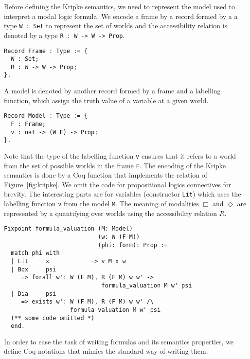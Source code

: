 \documentclass[sigconf,anonymous]{acmart}
\begin{document}
Before defining the Kripke semantics, we need to represent the model used to
interpret a modal logic formula. We encode a frame by a record formed by a
a type \texttt{W : Set} to represent the set of worlds and the
accessibility relation is denoted by a type \texttt{R : W -> W -> Prop}.
\begin{verbatim}
Record Frame : Type := {
  W : Set;
  R : W -> W -> Prop;
}.
\end{verbatim}
A model is denoted by another record formed by a frame and a labelling function,
which assign the truth value of a variable at a given world.
\begin{verbatim}
Record Model : Type := {
  F : Frame; 
  v : nat -> (W F) -> Prop; 
}.
\end{verbatim}
Note that the type of the labelling function \texttt{v} ensures that it
refers to a world from the set of possible worlds in the frame
\texttt{F}. The encoding of the Kripke semantics is done by a Coq function
that implements the relation of Figure~\ref{fig:kripke}. We omit the code
for propositional logics connectives for brevity. The interesting parts are for
variables (constructor \texttt{Lit}) which uses the labelling function
\texttt{v} from the model \texttt{M}. The meaning of
modalities $\Box$ and $\Diamond$ are represented by a quantifying over worlds
using the accessibility relation $R$. 
\begin{verbatim}
Fixpoint formula_valuation (M: Model)
                           (w: W (F M))
                           (phi: form): Prop :=
  match phi with
  | Lit     x            => v M x w 
  | Box     psi
     => forall w': W (F M), R (F M) w w' ->
                            formula_valuation M w' psi
  | Dia     psi
     => exists w': W (F M), R (F M) w w' /\
                   formula_valuation M w' psi
  (** some code omitted *)
  end.
\end{verbatim}
In order to ease the task of writing formulas and its semantics properties, we
define Coq notations that mimics the standard way of writing them.
\end{document}
